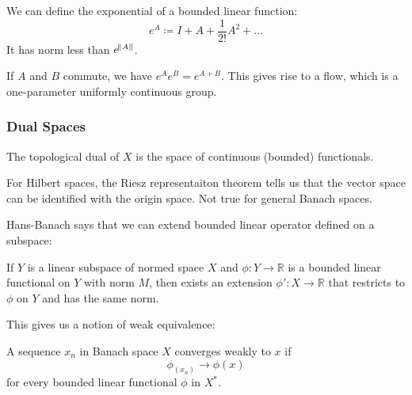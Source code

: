 \documentclass[main.tex]{subfiles}
\begin{document}
We can define the exponential of a bounded linear function:
$$
e^A \coloneqq I + A + \frac{1}{2!}A^2 + ...
$$
It has norm less than $e^{\norm{A}}$.

If $A$ and $B$ commute, we have $e^A e^B = e^{A + B}$. This gives rise to a flow, which is a one-parameter uniformly continuous group. 


\subsubsection{Dual Spaces}
The topological dual of $X$ is the space of continuous (bounded) functionals.

For Hilbert spaces, the Riesz representaiton theorem tells us that the vector space can be identified with the origin space. Not true for general Banach spaces.

Hans-Banach says that we can extend bounded linear operator defined on a subspace:

\begin{theorem}
If $Y$ is a linear subspace of normed space $X$ and $\phi: Y \rightarrow \mathbb{R}$ is a bounded linear functional on $Y$ with norm $M$, then exists an extension $\phi': X \rightarrow \mathbb{R}$ that restricts to $\phi$ on $Y$ and has the same norm.
\end{theorem}

This gives us a notion of weak equivalence:
\begin{definition}
A sequence $x_n$ in Banach space $X$ converges weakly to $x$ if 
$$
\phi_(x_n) \rightarrow \phi(x)
$$
for every bounded linear functional $\phi$ in $X^*$.
\end{definition}



\end{document}
